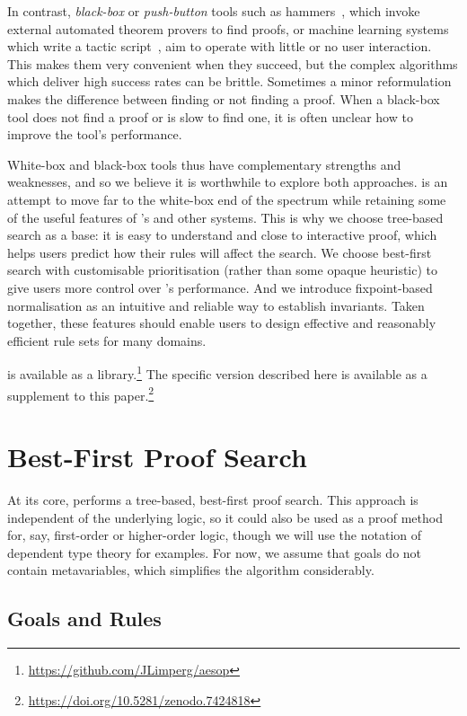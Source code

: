 In contrast, \emph{black-box} or \emph{push-button} tools such as hammers~\cite{Blanchette16}, which invoke external automated theorem provers to find proofs, or machine learning systems which write a tactic script~\cite{Bansal19,TacticToe,Han21,Lample22}, aim to operate with little or no user interaction.
This makes them very convenient when they succeed, but the complex algorithms which deliver high success rates can be brittle.
Sometimes a minor reformulation makes the difference between finding or not finding a proof.
When a black-box tool does not find a proof or is slow to find one, it is often unclear how to improve the tool's performance.

White-box and black-box tools thus have complementary strengths and weaknesses, and so we believe it is worthwhile to explore both approaches.
\Aesop{} is an attempt to move far to the white-box end of the spectrum while retaining some of the useful features of \Isabelle's \auto{} and other systems.
This is why we choose tree-based search as a base: it is easy to understand and close to interactive proof, which helps users predict how their rules will affect the search.
We choose best-first search with customisable prioritisation (rather than some opaque heuristic) to give users more control over \Aesop's performance.
And we introduce fixpoint-based normalisation as an intuitive and reliable way to establish invariants.
Taken together, these features should enable users to design effective and reasonably efficient rule sets for many domains.

\Aesop{} is available as a \Leanfour{} library.\footnote{\url{https://github.com/JLimperg/aesop}}
The specific version described here is available as a supplement to this paper.\footnote{\url{https://doi.org/10.5281/zenodo.7424818}}

\section{Best-First Proof Search}%
\label{sec:abstract-framework}

At its core, \Aesop{} performs a tree-based, best-first proof search.
This approach is independent of the underlying logic, so it could also be used as a proof method for, say, first-order or higher-order logic, though we will use the notation of dependent type theory for examples.
For now, we assume that goals do not contain metavariables, which simplifies the algorithm considerably.


\subsection{Goals and Rules}%
\label{sec:goals-rules}

